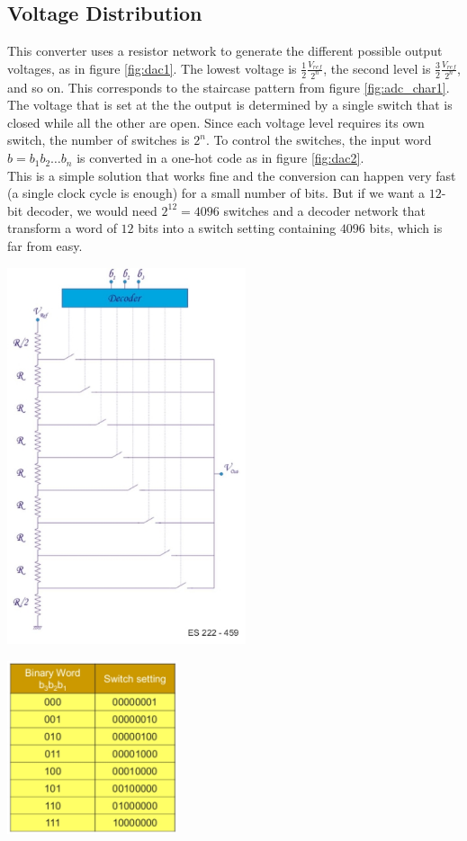 \subsection{Voltage Distribution}
\label{sec:dac_voltage_distribution}
This converter uses a resistor network to generate the different possible output voltages, as in figure \ref{fig:dac1}. The lowest voltage is $\frac{1}{2} \frac{V_{ref}}{2^n} $, the second level is $\frac{3}{2} \frac{V_{ref}}{2^n} $, and so on. This corresponds to the staircase pattern from figure \ref{fig:adc_char1}. The voltage that is set at the the output is determined by a single switch that is closed while all the other are open. Since each voltage level requires its own switch, the number of switches is $2^n$. To control the switches, the input word $b = b_1 b_2 \ldots b_n$ is converted in a one-hot code as in figure \ref{fig:dac2}.\\
This is a simple solution that works fine and the conversion can happen very fast (a single clock cycle is enough) for a small number of bits. But if we want a $12$-bit decoder, we would need $2^{12} = 4096$ switches and a decoder network that transform a word of $12$ bits into a switch setting containing $4096$ bits, which is far from easy.\\
\begin{minipage}{.6\textwidth}
	\centering
	\includegraphics[width=7cm]{figures/ch18/dac1.jpg}
	\label{fig:dac1}
\end{minipage}%
\begin{minipage}{.4\textwidth}
	\centering
	\includegraphics[width=5cm]{figures/ch18/dac2.jpg}
	\label{fig:dac2}
\end{minipage}



